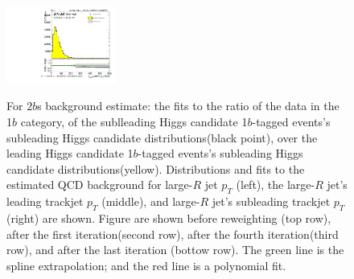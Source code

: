 \begin{figure}[htbp!]
\begin{center}
\includegraphics[width=0.32\textwidth,angle=-90]{figures/boosted/Reweight/Fits/Moriond_bkg_9_NoTag_2Trk_split_lead_Incl_sublHCand_trk1_Pt.pdf} \\
\caption{For $2b$s background estimate: the fits to the ratio of the data in the 1$b$ category, of the sublleading Higgs candidate 1$b$-tagged events's subleading Higgs candidate distributions(black point), over the leading Higgs candidate 1$b$-tagged events's subleading Higgs candidate distributions(yellow). Distributions and fits to the estimated QCD background for large-$R$ jet $p_{T}$ (left),  the large-$R$ jet's leading trackjet $p_T$ (middle), and large-$R$ jet's subleading trackjet $p_T$ (right) are shown.  Figure are shown before reweighting (top row), after the first iteration(second row), after the fourth iteration(third row), and after the last iteration (bottow row). The green line is the spline extrapolation; and the red line is a polynomial fit.}
\label{fig:rw-2bs-lead}
\end{center}
\end{figure}

